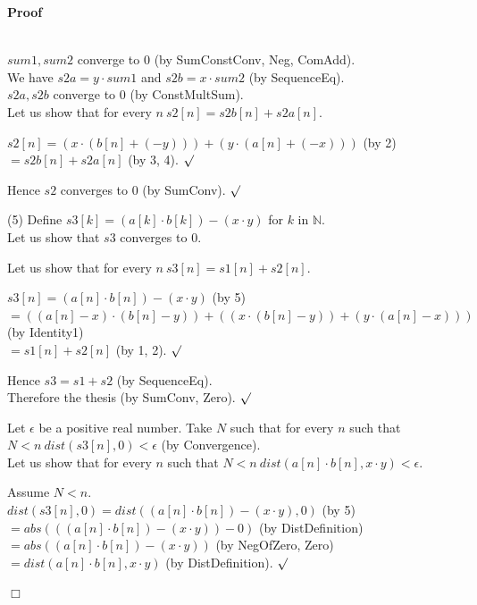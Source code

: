 \documentclass{article}
\newenvironment{forthel}{\begin{leftbar}}{\end{leftbar}}
\newenvironment{proof}{\noindent\textbf{Proof\ }}{\hspace*{\fill}$\Box$\medskip}
\newenvironment{subproof}{\begin{list}{}{}
		\item[\text{Proof}]}{\hfill $\surd$ \end{list}}
\newcommand{\NN}{\mathbb{N}}
\newcommand{\cdottwo}{\cdot}
\newcommand{\plusone}{+}
\newcommand{\dotequal}{=}
\begin{document}
\begin{forthel}
\begin{proof}
\begin{subproof}
	\\$sum1, sum2$ converge to $0$ (by SumConstConv, Neg, ComAdd).
	\\We have $s2a = y \cdottwo sum1$ and $s2b = x \cdottwo sum2$ (by SequenceEq).
	\\$s2a, s2b$ converge to $0$ (by ConstMultSum). 
	\\Let us show that for every $n \ s2[n] = s2b[n] + s2a[n]$.
	\begin{subproof}
	$s2[n] \dotequal (x \cdot (b[n] + (-y))) + (y \cdot (a[n] + (-x)))$ (by 2)\\
	$\dotequal s2b[n] + s2a[n]$ (by 3, 4).
	\end{subproof}
	Hence $s2$ converges to $0$ (by SumConv).
	\end{subproof}
	(5) Define $s3[k] = (a[k] \cdot b[k]) - (x \cdot y)$ for $k$ in $\NN$.
	\\Let us show that $s3$ converges to $0$.
	\begin{subproof}
	Let us show that for every $n \ s3[n] = s1[n] + s2[n]$.
	\begin{subproof}
	$s3[n] \dotequal (a[n] \cdot b[n]) - (x \cdot y)$ (by 5)
	\\$\dotequal ((a[n] - x) \cdot (b[n] - y)) + ((x \cdot (b[n] - y)) + (y \cdot (a[n] - x)))$ (by Identity1)
	\\$\dotequal s1[n] + s2[n]$ (by 1, 2).
	\end{subproof}
	Hence $s3 = s1 \plusone s2$ (by SequenceEq).
	\\Therefore the thesis (by SumConv, Zero).
	\end{subproof}
	Let $\epsilon$ be a positive real number.
	Take $N$ such that for every $n$ such that $N < n \ dist(s3[n],0) < \epsilon$ (by Convergence).
	\\Let us show that for every $n$ such that $N < n \ dist(a[n] \cdot b[n],x \cdot y) < \epsilon$.
	\begin{subproof}
	Assume $N < n$.
	\\$dist(s3[n],0) \dotequal dist((a[n] \cdot b[n]) - (x \cdot y),0)$ (by 5)
	\\$\dotequal abs(((a[n] \cdot b[n]) - (x \cdot y)) - 0)$ (by DistDefinition)
	\\$\dotequal abs((a[n] \cdot b[n]) - (x \cdot y))$ (by NegOfZero, Zero)
	\\$\dotequal dist(a[n] \cdot b[n],x \cdot y)$ (by DistDefinition).
	\end{subproof}
	\end{proof}

\end{forthel}
\end{document}
